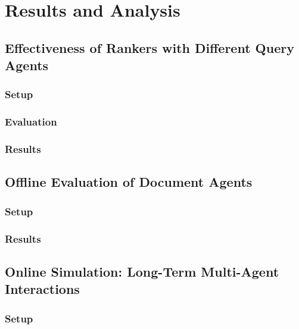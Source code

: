 
\section{Results and Analysis}
\label{sec:evaluation}
\subsection{Effectiveness of Rankers with Different Query Agents}
\label{sec:effectiveness-experiment}

\subsubsection{Setup}


\subsubsection{Evaluation}


\subsubsection{Results}



\subsection{Offline Evaluation of Document Agents}
\label{sec:offline-experiment}
\subsubsection{Setup}



\subsubsection{Results}


\subsection{Online Simulation: Long-Term Multi-Agent Interactions}
\label{sec:online-experiment}
\subsubsection{Setup}


